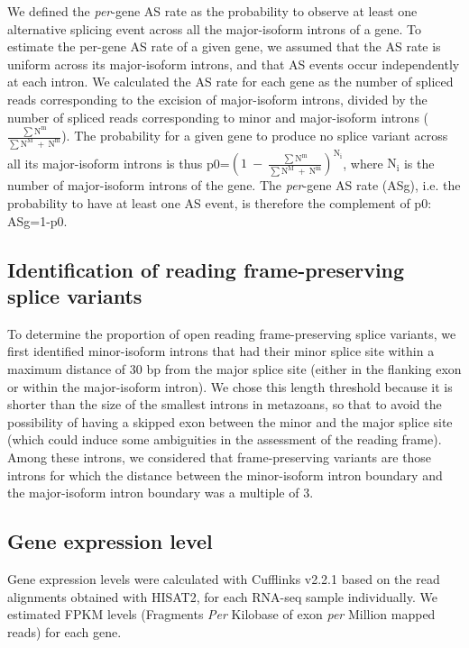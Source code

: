 We defined the \textit{per}-gene AS rate as the probability to observe at least one alternative splicing event across all the major-isoform introns of a gene. To estimate the per-gene AS rate of a given gene, we assumed that the AS rate is uniform across its major-isoform introns, and that AS events occur independently at each intron. We calculated the AS rate for each gene as the number of spliced reads corresponding to the excision of major-isoform introns, divided by the number of spliced reads corresponding to minor and major-isoform introns ($\mathrm{\frac{\sum{N^m}}{\sum{N^M~+~N^m}}}$). The probability for a given gene to produce no splice variant across all its major-isoform introns is thus p0=$\mathrm{(1~-~\frac{\sum{N^m}}{\sum{N^M~+~N^m}})^{N_i}}$, where $\mathrm{N_i}$ is the number of major-isoform introns of the gene. The \textit{per}-gene AS rate (ASg), i.e. the probability to have at least one AS event, is therefore the complement of p0: ASg=1-p0.

\subsection{Identification of reading frame-preserving splice variants}
To determine the proportion of open reading frame-preserving splice variants, we first identified minor-isoform introns that had their minor splice site within a maximum distance of 30 bp from the major splice site (either in the flanking exon or within the major-isoform intron). We chose this length threshold because it is shorter than the size of the smallest introns in metazoans, so that to avoid the possibility of having a skipped exon between the minor and the major splice site (which could induce some ambiguities in the assessment of the reading frame). Among these introns, we considered that frame-preserving variants are those introns for which the distance between the minor-isoform intron boundary and the major-isoform intron boundary was a multiple of 3.

\subsection{Gene expression level}
Gene expression levels were calculated with Cufflinks v2.2.1 \citep{roberts_identification_2011} based on the read alignments obtained with HISAT2, for each RNA-seq sample individually. We estimated FPKM levels (Fragments \textit{Per} Kilobase of exon \textit{per} Million mapped reads) for each gene.

